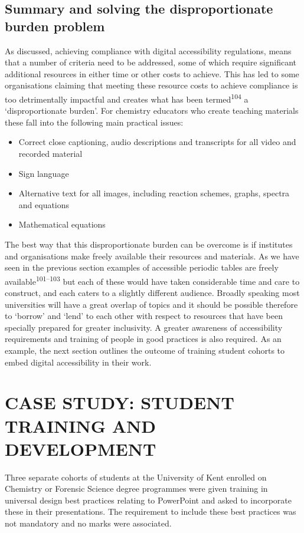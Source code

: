 \documentclass[11.5pt]{sig-alternate} %
\begin{document}
\begin{large}
\subsection*{Summary and solving the disproportionate burden problem}

As discussed, achieving compliance with digital accessibility regulations, means that a number of criteria need to be addressed, some of which require significant additional resources in either time or other costs to achieve. This has led to some organisations claiming that meeting these resource costs to achieve compliance is too detrimentally impactful and creates what has been termed\textsuperscript{104} a ‘disproportionate burden’.  For chemistry educators who create teaching materials these fall into the following main practical issues:

\begin{itemize}
    \item Correct close captioning, audio descriptions and transcripts for all video and recorded material
    \item Sign language
    \item Alternative text for all images, including reaction schemes, graphs, spectra and equations
    \item Mathematical equations
\end{itemize}

The best way that this disproportionate burden can be overcome is if institutes and organisations make freely available their resources and materials. As we have seen in the previous section examples of accessible periodic tables are freely available\textsuperscript{101–103} but each of these would have taken considerable time and care to construct, and each caters to a slightly different audience. Broadly speaking most universities will have a great overlap of topics and it should be possible therefore to ‘borrow’ and ‘lend’ to each other with respect to resources that have been specially prepared for greater inclusivity.  A greater awareness of accessibility requirements and training of people in good practices is also required. As an example, the next section outlines the outcome of training student cohorts to embed digital accessibility in their work.

\section*{CASE STUDY: STUDENT TRAINING AND DEVELOPMENT}
Three separate cohorts of students at the University of Kent enrolled on Chemistry or Forensic Science degree programmes were given training in universal design best practices relating to PowerPoint and asked to incorporate these in their presentations. The requirement to include these best practices was not mandatory and no marks were associated.  


\end{large}
\end{document}
